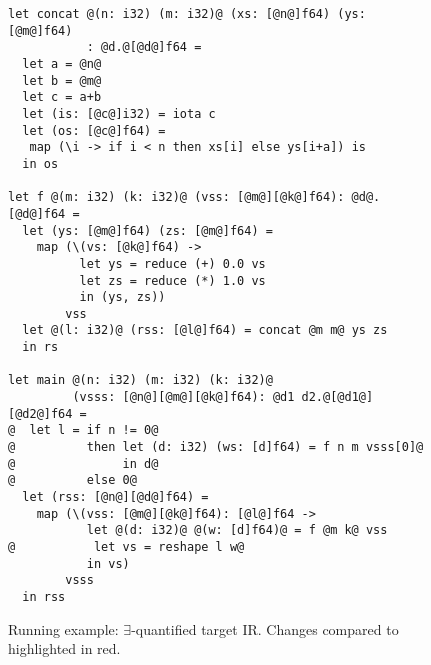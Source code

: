 \begin{figure}
\begin{lstlisting}
let concat @(n: i32) (m: i32)@ (xs: [@n@]f64) (ys: [@m@]f64)
           : @d.@[@d@]f64 =
  let a = @n@
  let b = @m@
  let c = a+b
  let (is: [@c@]i32) = iota c
  let (os: [@c@]f64) =
   map (\i -> if i < n then xs[i] else ys[i+a]) is
  in os

let f @(m: i32) (k: i32)@ (vss: [@m@][@k@]f64): @d@.[@d@]f64 =
  let (ys: [@m@]f64) (zs: [@m@]f64) =
    map (\(vs: [@k@]f64) ->
          let ys = reduce (+) 0.0 vs
          let zs = reduce (*) 1.0 vs
          in (ys, zs))
        vss
  let @(l: i32)@ (rss: [@l@]f64) = concat @m m@ ys zs
  in rs

let main @(n: i32) (m: i32) (k: i32)@
         (vsss: [@n@][@m@][@k@]f64): @d1 d2.@[@d1@][@d2@]f64 =
@  let l = if n != 0@
@          then let (d: i32) (ws: [d]f64) = f n m vsss[0]@
@               in d@
@          else 0@
  let (rss: [@n@][@d@]f64) =
    map (\(vss: [@m@][@k@]f64): [@l@]f64 ->
           let @(d: i32)@ @(w: [d]f64)@ = f @m k@ vss
@           let vs = reshape l w@
           in vs)
        vsss
  in rss
\end{lstlisting}

  \caption{Running example:
    $\exists$-quantified target IR.  Changes compared to
     highlighted in red.}
\label{fig:RunEgTgt}
\end{figure}

